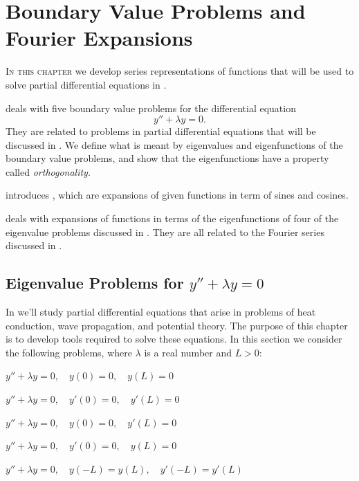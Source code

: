 

\chapter{Boundary Value Problems and Fourier Expansions}\label{ch:bvp_fourier}

\textsc{In this chapter} we develop series representations of functions
that will be used to solve partial differential equations in
.


\medskip\noindent
{} deals with five boundary value problems
for the differential equation
\[
y''+\lambda y=0.
\]
They are related to problems in partial
differential equations that will be discussed in .
We define what is meant by eigenvalues and eigenfunctions of
the boundary value  problems, and  show that  the eigenfunctions have
a property called \emph{\color{blue}orthogonality}.


\medskip\noindent
{} introduces
,
which are  expansions
of given functions in term of sines and cosines.

\medskip\noindent
{} deals with expansions of functions in terms
of the eigenfunctions of four of the eigenvalue problems discussed
in . They are all related to the Fourier series
discussed in .

\newpage


\section{Eigenvalue Problems for \texorpdfstring{$y''+\lambda y=0$}{y''+𝜆y=0}}
\label{sec:eig_probs}

In  we'll study partial differential equations
that arise in problems of heat conduction, wave propagation, and
potential theory. The purpose of this chapter is to develop tools
required to solve these equations. In this section we consider the
following problems, where $\lambda$ is a real number and $L>0$:

\begin{enumext}[label=\arabic*,wrap-label={Problem #1:},labelwidth=6em]
\item $y''+\lambda y=0,\quad y(0)=0,\quad y(L)=0$
\item $y''+\lambda y=0,\quad y'(0)=0,\quad y'(L)=0$
\item $y''+\lambda y=0,\quad y(0)=0,\quad y'(L)=0$
\item $y''+\lambda y=0,\quad y'(0)=0,\quad y(L)=0$
\item $y''+\lambda y=0,\quad y(-L)=y(L),\quad y'(-L)=y'(L)$
\end{enumext}

